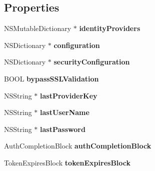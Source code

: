 \subsection*{Properties}
\begin{DoxyCompactItemize}
\item 
\hypertarget{interface_k_z_application_ac06db12fa73806b1ab9681ba015f7623}{N\-S\-Mutable\-Dictionary $\ast$ {\bfseries identity\-Providers}}\label{interface_k_z_application_ac06db12fa73806b1ab9681ba015f7623}

\item 
\hypertarget{interface_k_z_application_a70486dabba7fc972a19e78bee07a3917}{N\-S\-Dictionary $\ast$ {\bfseries configuration}}\label{interface_k_z_application_a70486dabba7fc972a19e78bee07a3917}

\item 
\hypertarget{interface_k_z_application_aa41d8b0de6cb4c6e8114a2f14f070943}{N\-S\-Dictionary $\ast$ {\bfseries security\-Configuration}}\label{interface_k_z_application_aa41d8b0de6cb4c6e8114a2f14f070943}

\item 
\hypertarget{interface_k_z_application_ad04667c5b3ffc34fadc5a79c02993b66}{B\-O\-O\-L {\bfseries bypass\-S\-S\-L\-Validation}}\label{interface_k_z_application_ad04667c5b3ffc34fadc5a79c02993b66}

\item 
\hypertarget{interface_k_z_application_ab4a6062d491bd276df246284e24a435a}{N\-S\-String $\ast$ {\bfseries last\-Provider\-Key}}\label{interface_k_z_application_ab4a6062d491bd276df246284e24a435a}

\item 
\hypertarget{interface_k_z_application_a05485610fc13290be64ece9b5b40c141}{N\-S\-String $\ast$ {\bfseries last\-User\-Name}}\label{interface_k_z_application_a05485610fc13290be64ece9b5b40c141}

\item 
\hypertarget{interface_k_z_application_a6a7b3c270b48257ad69111b0b788e2dd}{N\-S\-String $\ast$ {\bfseries last\-Password}}\label{interface_k_z_application_a6a7b3c270b48257ad69111b0b788e2dd}

\item 
\hypertarget{interface_k_z_application_a37fcb941bae05a6532af95d4c95d9fbc}{Auth\-Completion\-Block {\bfseries auth\-Completion\-Block}}\label{interface_k_z_application_a37fcb941bae05a6532af95d4c95d9fbc}

\item 
\hypertarget{interface_k_z_application_aa79d46db0e8c305b7afc49827113d288}{Token\-Expires\-Block {\bfseries token\-Expires\-Block}}\label{interface_k_z_application_aa79d46db0e8c305b7afc49827113d288}


\end{DoxyCompactItemize}
